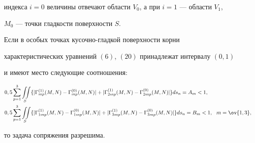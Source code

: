 индекса $i=0$ величины отвечают области $V_0$, а при $i=1$ --- области $V_1$, 


$M_0$ --- точки гладкости поверхности $S$. 


 


 


\begin{thmnonum} 


Если в особых точках кусочно-гладкой поверхности корни  


характеристических уравнений $(6)$, $(20)$ принадлежат интервалу $(0,1)$ 


и имеют место следующие соотношения\/${:}$ 


\begin{align} %


&0,5\sum^3_{p=1}\iint\limits_S\{|\Gamma^{(1)}_{mp}(M,N)- 


\Gamma^{(0)}_{mp}(M,N)|+|\Gamma^{(1)}_{2mp}(M,N)- 


\Gamma^{(0)}_{2mp}(M,N)|\}ds_n=A_m<1,\\ 


% 


&0,5\sum^3_{p=1}\iint\limits_S\{|\Gamma^{(1)}_{1mp}(M,N)- 


\Gamma^{(0)}_{1mp}(M,N)|+|\Gamma^{(1)}_{3mp}(M,N)- 


\Gamma^{(0)}_{3mp}(M,N)|\}ds_n=B_m<1,\ \ m=\ov{1,3},\notag


\end{align} 


то задача сопряжения разрешима. 


\end{thmnonum} 


 


